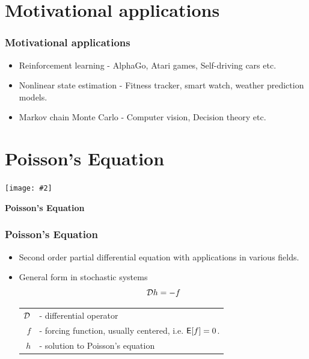\documentclass[xcolor=dvipsnames, subsection=false]{beamer}
\def\alertb#1{\alert{\color{BrickRed}  #1}}
\def\alertb#1{\alert{\color{BrickRed}  #1}}
\newcounter{temp}
\newenvironment{framesection}%
{\setcounter{temp}{\value{framenumber}}
\begin{frame}
\thispagestyle{empty}
}%
{\end{frame}\setcounter{framenumber}{\value{temp}}}
\def\Expect{{\sf E}}
\def\Ebox#1#2{%
	\begin{center}
		\texttt{[image: \#2]} %
	\end{center}}
\def\generate{{\cal D}}
\def\Expect{{\sf E}}
\begin{document}
\section{Motivational applications}
\begin{frame}
\frametitle{Motivational applications}
\begin{itemize}
	\item \alertb{Reinforcement learning} - AlphaGo, Atari games, Self-driving cars etc.\pause
	\item \alertb{Nonlinear state estimation} - Fitness tracker, smart watch, weather prediction models.\pause
	\item \alertb{Markov chain Monte Carlo} - Computer vision, Decision theory etc.
\end{itemize}
\end{frame}
\section{Poisson's Equation}

\begin{framesection}
	
	
	\Ebox{.6}{FishBanner.pdf}
	
	\vfill
	
	\centerline{\Large\bf Poisson's Equation}
	
\end{framesection}


\begin{frame}
\frametitle{Poisson's Equation}
\begin{itemize}
	\item Second order partial differential equation with applications in various fields.
	\item General form in stochastic systems
	{\LARGE
	\[
	\generate h =  -f
	\]
    }
	
	
	\begin{tabular}{rl}
$\generate$ & - differential operator\\
$f$ & - forcing function, usually centered, i.e. $\Expect[f] = 0$.\\ \pause
{\LARGE \alertb{$h$}} & {\LARGE \alertb{- solution to Poisson's equation}}
	\end{tabular}
\end{itemize}
\end{frame}
\end{document}
